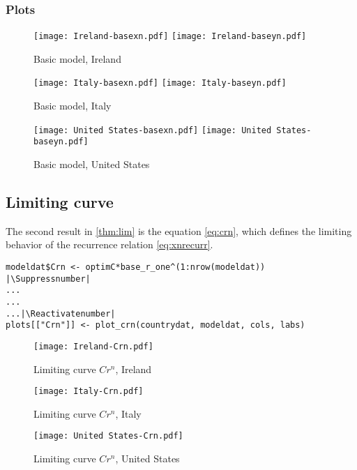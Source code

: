 \subsubsection{Plots}

\begin{figure}[H]
  \texttt{[image: Ireland-basexn.pdf]} \label{fig:ireland-basexn}
\endminipage\hfill
{}
  \texttt{[image: Ireland-baseyn.pdf]} \label{fig:ireland-baseyn}
\endminipage
\caption{Basic model, Ireland}
\end{figure}

\begin{figure}[H]
  \texttt{[image: Italy-basexn.pdf]} \label{fig:italy-basexn}
\endminipage\hfill
{}
  \texttt{[image: Italy-baseyn.pdf]} \label{fig:italy-baseyn}
\endminipage
\caption{Basic model, Italy}
\end{figure}

\begin{figure}[H]
  \texttt{[image: United States-basexn.pdf]} \label{fig:usa-basexn}
\endminipage\hfill
{}
  \texttt{[image: United States-baseyn.pdf]} \label{fig:usa-baseyn}
\endminipage
\caption{Basic model, United States}
\end{figure}

\subsection{Limiting curve }

The second result in \ref{thm:lim} is the equation \eqref{eq:crn}, which defines the limiting behavior of the recurrence relation \eqref{eq:xnrecurr}.

\begin{lstlisting}[breaklines = true, escapeinside=||, tabsize = 4, caption = {Algorithm for Limiting Curve}]
modeldat$Crn <- optimC*base_r_one^(1:nrow(modeldat))  |\Suppressnumber|
...
...
...|\Reactivatenumber|
plots[["Crn"]] <- plot_crn(countrydat, modeldat, cols, labs)
\end{lstlisting}

\begin{figure}[H]
\texttt{[image: Ireland-Crn.pdf]}
\caption{Limiting curve $Cr^n$, Ireland}
\endminipage 
{}
\texttt{[image: Italy-Crn.pdf]}
\caption{Limiting curve $Cr^n$, Italy}
\endminipage 
{}
\texttt{[image: United States-Crn.pdf]}
\caption{Limiting curve $Cr^n$, United States}
\endminipage 
\end{figure}

